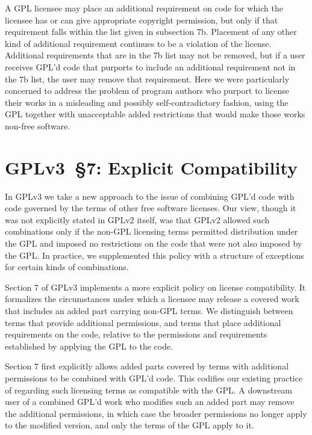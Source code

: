 
A GPL licensee may place an additional requirement on code for which the
licensee has or can give appropriate copyright permission, but only if that
requirement falls within the list given in subsection 7b.  Placement of any
other kind of additional requirement continues to be a violation of the
license.  Additional requirements that are in the 7b list may not be removed,
but if a user receives GPL'd code that purports to include an additional
requirement not in the 7b list, the user may remove that requirement.  Here
we were particularly concerned to address the problem of program authors who
purport to license their works in a misleading and possibly
self-contradictory fashion, using the GPL together with unacceptable added
restrictions that would make those works non-free software.

\section{GPLv3~\S7: Explicit Compatibility}



In GPLv3 we take a new approach to the issue of combining GPL'd code with
code governed by the terms of other free software licenses. Our view, though
it was not explicitly stated in GPLv2 itself, was that GPLv2 allowed such
combinations only if the non-GPL licensing terms permitted distribution under
the GPL and imposed no restrictions on the code that were not also imposed by
the GPL. In practice, we supplemented this policy with a structure of
exceptions for certain kinds of combinations.


Section 7 of GPLv3 implements a more explicit policy on license
compatibility. It formalizes the circumstances under which a licensee may
release a covered work that includes an added part carrying non-GPL terms. We
distinguish between terms that provide additional permissions, and terms that
place additional requirements on the code, relative to the permissions and
requirements established by applying the GPL to the code.


Section 7 first explicitly allows added parts covered by terms with
additional permissions to be combined with GPL'd code. This codifies our
existing practice of regarding such licensing terms as compatible with the
GPL. A downstream user of a combined GPL'd work who modifies such an added
part may remove the additional permissions, in which case the broader
permissions no longer apply to the modified version, and only the terms of
the GPL apply to it.

